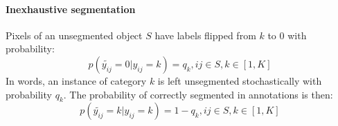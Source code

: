 \paragraph{Inexhaustive segmentation}

Pixels of an unsegmented object $S$ have labels flipped from $k$ to $0$ with probability:
$$p(\tilde{y_{ij}}=0\vert y_{ij}=k) = q_k, ij \in S, k \in [1,K]$$
In words, an instance of category $k$ is left unsegmented stochastically with probability $q_k$.
The probability of correctly segmented in annotations is then:
$$p(\tilde{y_{ij}}=k\vert y_{ij}=k) = 1-q_k, ij \in S, k \in [1,K]$$



